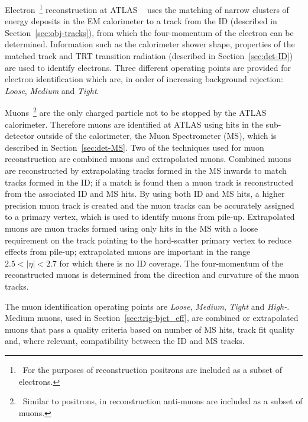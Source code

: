 Electron~\footnote{\ For the purposes of reconstruction positrons are included as a subset of electrons.}
reconstruction at ATLAS ~\cite{obj-electrons} uses
the matching of narrow clusters of energy deposits in the EM calorimeter
to a track from the ID (described in Section~\ref{sec:obj-tracks}),
from which the four-momentum of the electron can be determined.
Information such as the calorimeter shower shape,
properties of the matched track
and TRT transition radiation (described in Section~\ref{sec:det-ID})
are used to identify electrons.
Three different operating points are provided for electron identification
which are, in order of increasing background rejection:
\textit{Loose}, \textit{Medium} and \textit{Tight}. 

Muons~\footnote{\ Similar to positrons, in reconstruction anti-muons are included as a subset of muons.}
are the only charged particle not to be stopped by the ATLAS calorimeter.
Therefore muons are identified at ATLAS using hits in the sub-detector outside of the calorimeter, the Muon Spectrometer (MS), which is described in Section~\ref{sec:det-MS}.
Two of the techniques used for muon reconstruction are combined muons and extrapolated muons.
Combined muons are reconstructed by extrapolating tracks formed in the MS inwards to match tracks formed in the ID;
if a match is found then a muon track is reconstructed from the associated ID and MS hits.
By using both ID and MS hits, a higher precision muon track is created
and the muon tracks can be accurately assigned to a primary vertex, which is used to identify muons from pile-up.
Extrapolated muons are muon tracks formed using only hits in the MS
with a loose requirement on the track pointing to the hard-scatter primary vertex to reduce effects from pile-up;
extrapolated muons are important in the range $2.5 < |\eta| < 2.7$ for which there is no ID coverage.
The four-momentum of the reconstructed muons is determined from the direction and curvature of the muon tracks.

The muon identification operating points are \textit{Loose}, \textit{Medium}, \textit{Tight} and \textit{High-\pT{}}.
Medium muons, used in Section~\ref{sec:trig-bjet_eff}, are combined or extrapolated muons that pass a quality criteria based on
number of MS hits, track fit quality and, where relevant, compatibility between the ID and MS tracks.

